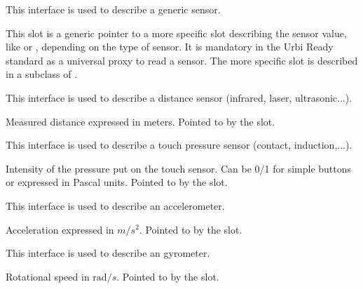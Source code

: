 
This interface is used to describe a generic sensor.

\begin{slots}
  {%
    This slot is a generic pointer to a more specific slot describing
    the sensor value, like  or ,
    depending on the type of sensor. It is mandatory in the Urbi Ready
    standard as a universal proxy to read a sensor. The more specific
    slot is described in a subclass of .%
  }

\end{slots}



This interface is used to describe a distance sensor (infrared, laser,
ultrasonic...).

\begin{slots}
  {%
    Measured distance expressed in meters.  Pointed to by the
     slot.%
  }

\end{slots}



This interface is used to describe a touch pressure sensor (contact,
induction,...).

\begin{slots}
  {%
    Intensity of the pressure put on the touch sensor. Can be 0/1 for
    simple buttons or expressed in Pascal units. Pointed to by the
     slot.%
  }

\end{slots}



This interface is used to describe an accelerometer.

\begin{slots}
  {%
    Acceleration expressed in $m/s^2$.  Pointed to by the 
    slot.%
  }

\end{slots}

This interface is used to describe an gyrometer.

\begin{slots}
  {%
    Rotational speed in $\mathrm{rad}/s$.  Pointed to by the
     slot.%
  }
\end{slots}

